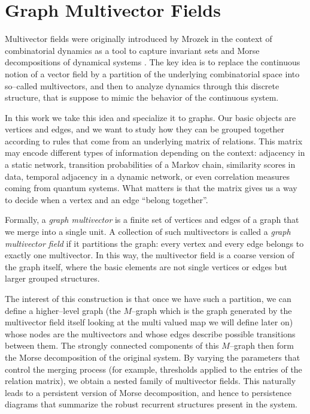 \documentclass{article}
\theoremstyle{definition}
\theoremstyle{plain}
\theoremstyle{remark}
\newcommand{\1}{\mathbbm{1}}  %
\begin{document}
\section{Graph Multivector Fields}

Multivector fields were originally introduced by Mrozek \cite{lipinski2019conley} in the context of
combinatorial dynamics as a tool to capture invariant sets and Morse
decompositions of dynamical systems \cite{Woukeng_2024}. The key idea is to replace the
continuous notion of a vector field by a partition of the underlying
combinatorial space into so--called multivectors, and then to analyze
dynamics through this discrete structure, that is suppose to mimic the behavior of the continuous system.

In this work we take this idea and specialize it to graphs. Our basic
objects are vertices and edges, and we want to study how they can be
grouped together according to rules that come from an underlying matrix
of relations. This matrix may encode different types of information
depending on the context: adjacency in a static network, transition
probabilities of a Markov chain, similarity scores in data, temporal
adjacency in a dynamic network, or even correlation measures coming from
quantum systems. What matters is that the matrix gives us a way to decide
when a vertex and an edge ``belong together''.

Formally, a \emph{graph multivector} is a finite set of vertices and
edges of a graph that we merge into a single unit. A collection of such
multivectors is called a \emph{graph multivector field} if it partitions
the graph: every vertex and every edge belongs to exactly one
multivector. In this way, the multivector field is a coarse version of
the graph itself, where the basic elements are not single vertices or
edges but larger grouped structures.

The interest of this construction is that once we have such a
partition, we can define a higher--level graph (the $M$--graph which is the graph generated by the multivector field itself looking at the multi valued map we will define later on) whose
nodes are the multivectors and whose edges describe possible transitions
between them. The strongly connected components of this $M$--graph then
form the Morse decomposition of the original system. By varying the
parameters that control the merging process (for example, thresholds
applied to the entries of the relation matrix), we obtain a nested family
of multivector fields. This naturally leads to a persistent version of
Morse decomposition, and hence to persistence diagrams that summarize the
robust recurrent structures present in the system.
\end{document}
